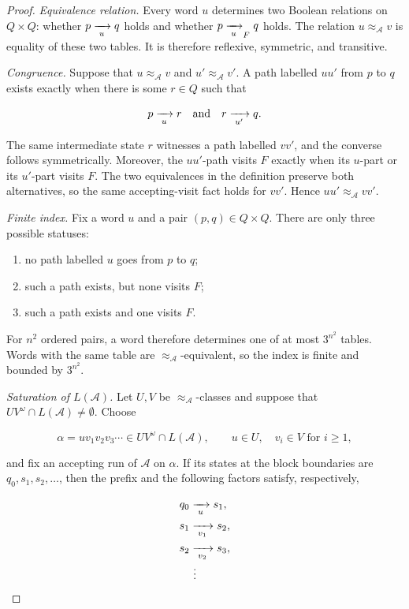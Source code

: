 \begin{proof}
\emph{Equivalence relation.}
Every word $u$ determines two Boolean relations on $Q\times Q$: whether
$p\xrightarrow[{\;u\;}]{}q$ holds and whether $p\xrightarrow[{\;u\;}]{}_{F}q$ holds.  The relation
$u\approx_{\mathcal A}v$ is equality of these two tables.  It is therefore
reflexive, symmetric, and transitive.

\emph{Congruence.}
Suppose that $u\approx_{\mathcal A}v$ and
$u'\approx_{\mathcal A}v'$.  A path labelled $uu'$ from $p$ to $q$
exists exactly when there is some $r\in Q$ such that

\[
  p\xrightarrow[{\;u\;}]{}r \quad\text{and}\quad r\xrightarrow[{\;u'\;}]{}q.
\]

The same intermediate state $r$ witnesses a path labelled $vv'$, and
the converse follows symmetrically.  Moreover, the $uu'$-path visits
$F$ exactly when its $u$-part or its $u'$-part visits $F$.  The two
equivalences in the definition preserve both alternatives, so the same
accepting-visit fact holds for $vv'$.  Hence
$uu'\approx_{\mathcal A}vv'$.

\emph{Finite index.}
Fix a word $u$ and a pair $(p,q)\in Q\times Q$.  There are only three
possible statuses:
\begin{enumerate}[nosep]
  \item no path labelled $u$ goes from $p$ to $q$;
  \item such a path exists, but none visits $F$;
  \item such a path exists and one visits $F$.
\end{enumerate}
For $n^2$ ordered pairs, a word therefore determines one of at most
$3^{n^2}$ tables.  Words with the same table are
$\approx_{\mathcal A}$-equivalent, so the index is finite and bounded by
$3^{n^2}$.

\emph{Saturation of $L(\mathcal A)$.}
Let $U,V$ be $\approx_{\mathcal A}$-classes and suppose that
$UV^\omega\cap L(\mathcal A)\neq\emptyset$.  Choose

\[
  \alpha=uv_1v_2v_3\cdots\in UV^\omega\cap L(\mathcal A),
  \qquad
  u\in U,\quad v_i\in V\text{ for }i\geq 1,
\]

and fix an accepting run of $\mathcal A$ on $\alpha$.  If its states at
the block boundaries are $q_0,s_1,s_2,\ldots$, then the prefix and the
following factors satisfy, respectively,

\[
  \begin{aligned}
    q_0 &\xrightarrow[{\;u\;}]{}   s_1,\\
    s_1 &\xrightarrow[{\;v_1\;}]{} s_2,\\
    s_2 &\xrightarrow[{\;v_2\;}]{} s_3,\\[-2pt]
        &\ \vdots
  \end{aligned}
\]


\end{proof}
